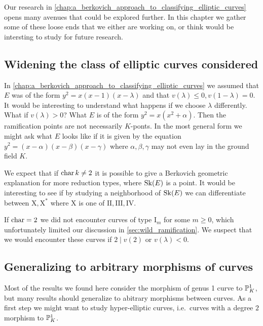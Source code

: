 Our research in \cref{chap:a_berkovich_approach_to_classifying_elliptic_curves} opens many avenues that could be explored further. 
In this chapter we gather some of these loose ends that we either are working on, or think would be intersting to study for future research. 


\subsection*{Widening the class of elliptic curves considered} \label{sec:widening_the_class_of_elliptic_curves_considered}

In \cref{chap:a_berkovich_approach_to_classifying_elliptic_curves} we assumed that $E$ was of the form $y^2 = x(x-1)(x-\lambda)$ and that $v(\lambda) \le 0, v(1-\lambda) = 0$. 
It would be interesting to understand what happens if we choose $\lambda$ differently. 
What if $v(\lambda) > 0$? 
What  $E$ is of the form $y^2 = x(x^2 + \alpha)$. Then the ramification points are not necessarily $K$-ponts. 
In the most general form we might ask what $E$ looks like if it is given by the equation $y^2 = (x-\alpha)(x-\beta)(x-\gamma)$ where $\alpha, \beta, \gamma$ may not even lay in the ground field $K$. 

We expect that if $\operatorname{char} k \ne 2$ it is possible to give a Berkovich geometric explanation for more reduction types, where $\operatorname{Sk}(E)$ is a point. 
It would be interesting to see if by studying a neighborhood of $\operatorname{Sk}(E)$ we can differentiate between $\mathrm {X}, \mathrm{X}^*$ where $\mathrm {X}$ is one of  $\mathrm{II}, \mathrm{III}, \mathrm{IV}$. 

If $\operatorname{char} = 2$ we did not encounter curves of type $\mathrm I_m$ for some $m \ge 0$, which unfortunately limited our discussion in \cref{sec:wild_ramification}. 
We suspect that we would encounter these curves if $2 \mid v(2)$ or $v(\lambda) < 0$. 



\subsection*{Generalizing to arbitrary morphisms of curves} \label{sec:generalizing_to_arbitrary_morphisms_of_curves}

Most of the results we found here consider the morphism of genus 1 curve to $\mathbb{P}^{1}_K$, but many results should generalize to abitrary morphisms between curves. 
As a first step we might want to study hyper-elliptic curves, i.e.\ curves with a degree $2$ morphism to $\mathbb{P}^{1}_K$.

